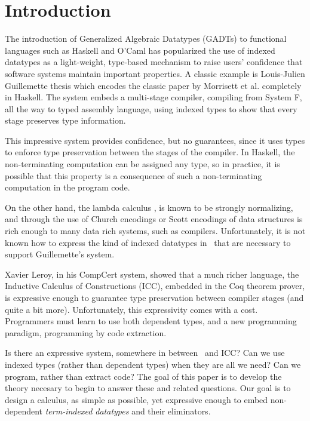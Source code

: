 \section{Introduction}
\label{sec:intro}


The introduction of Generalized Algebraic Datatypes (GADTs) to functional
languages such as Haskell and O'Caml has popularized the use of indexed datatypes
as a light-weight, type-based mechanism to raise users' confidence that software systems
maintain important properties. A classic example is 
Louis-Julien Guillemette thesis\cite{guillemetteThesis} which encodes the classic 
paper by Morrisett et al.\cite{tal-toplas} completely in Haskell. The 
system embeds a multi-stage compiler, compiling from System F, all the way
to typed assembly language, using indexed
types to show that every stage preserves type information.

This impressive system provides confidence, but no guarantees, since it uses types to enforce
type preservation between the stages of the compiler. In Haskell, the non-terminating computation
can be assigned any type, so in practice, it is possible that this property is a consequence
of such a non-terminating computation in the program code.

On the other hand, the lambda calculus \Fw, is known to be strongly normalizing, and
through the use of Church encodings or Scott encodings of data structures is rich enough
to many data rich systems, such as compilers. Unfortunately, it is not known
how to express the kind of indexed datatypes in \Fw\ that are necessary to
support Guillemette's system.

Xavier Leroy, in his CompCert system\cite{Leroy-Compcert-CACM}, showed that a much richer
language, the Inductive Calculus of Constructions (ICC), embedded in the Coq theorem prover,
is expressive enough to guarantee type preservation between compiler stages
(and quite a bit more). Unfortunately, this expressivity comes with a cost.
Programmers must learn to use both dependent types, and a new programming
paradigm, programming by code extraction.

Is there an expressive system, somewhere in between \Fw\ and ICC? Can we use
indexed types (rather than dependent types) when they are all we need? Can
we program, rather than extract code? The
goal of this paper is to develop the theory necesary to begin to answer
these and related questions.  Our goal is to design a calculus, as simple as possible, yet expressive enough
to embed non-dependent \emph{term-indexed datatypes} and their eliminators.

